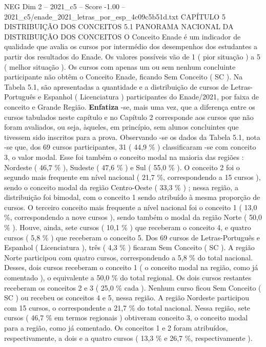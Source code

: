 \begin{textsample}{NEG Dim 2 – 2021\_c5 – Score -1.00 – 2021\_c5/enade\_2021\_letras\_por\_esp\_4c09c5b51d.txt}  \label{ex:f2_neg_147}
CAPÍTULO 5 DISTRIBUIÇÃO DOS CONCEITOS 5.1 PANORAMA NACIONAL DA DISTRIBUIÇÃO DOS CONCEITOS O Conceito Enade é um indicador de qualidade que avalia os cursos por intermédio dos desempenhos dos estudantes a partir dos resultados do Enade.
Os valores possíveis vão de 1 ( pior situação ) a 5 ( melhor situação ).
Os cursos com apenas um ou sem nenhum concluinte participante não obtêm o Conceito Enade, ficando Sem Conceito ( SC ).
Na Tabela 5.1, são apresentadas a quantidade e a distribuição de cursos de Letras-Português e Espanhol ( Licenciatura ) participantes do Enade/2021, por faixa de conceito e Grande Região. \textbf{Enfatiza} -se, mais uma vez, que a diferença entre os cursos tabulados neste capítulo e no Capítulo 2 corresponde aos cursos que não foram avaliados, ou seja, àqueles, em princípio, sem alunos concluintes que tivessem sido inscritos para a prova.
Observando -se os dados da Tabela 5.1, nota -se que, dos 69 cursos participantes, 31 ( 44,9 \% ) classificaram -se com conceito 3, o valor modal.
Esse foi também o conceito modal na maioria das regiões : Nordeste ( 46,7 \% ), Sudeste ( 47,6 \% ) e Sul ( 55,0 \% ).
O conceito 2 foi o segundo mais frequente em nível nacional ( 21,7 \%, correspondendo a 15 cursos ), sendo o conceito modal da região Centro-Oeste ( 33,3 \% ) ; nessa região, a distribuição foi bimodal, com o conceito 1 sendo atribuído à mesma proporção de cursos.
O terceiro conceito mais frequente a nível nacional foi o conceito 1 ( 13,0 \%, correspondendo a nove cursos ), sendo também o modal da região Norte ( 50,0 \% ).
Houve, ainda, sete cursos ( 10,1 \% ) que receberam o conceito 4, e quatro cursos ( 5,8 \% ) que receberam o conceito 5.
Dos 69 cursos de Letras-Português e Espanhol ( Licenciatura ), três ( 4,3 \% ) ficaram Sem Conceito ( SC ).
A região Norte participou com quatro cursos, correspondendo a 5,8 \% do total nacional.
Desses, dois cursos receberam o conceito 1 ( o conceito modal na região, como já comentado ), o equivalente a 50,0 \% do total regional.
Os dois cursos restantes receberam os conceitos 2 e 3 ( 25,0 \% cada ).
Nenhum curso ficou Sem Conceito ( SC ) ou recebeu os conceitos 4 e 5, nessa região.
A região Nordeste participou com 15 cursos, o correspondente a 21,7 \% do total nacional.
Nessa região, sete cursos ( 46,7 \% em termos regionais ) obtiveram conceito 3, o conceito modal para a região, como já comentado.
Os conceitos 1 e 2 foram atribuídos, respectivamente, a dois e a quatro cursos ( 13,3 \% e 26,7 \%, respectivamente ).

\end{textsample}
